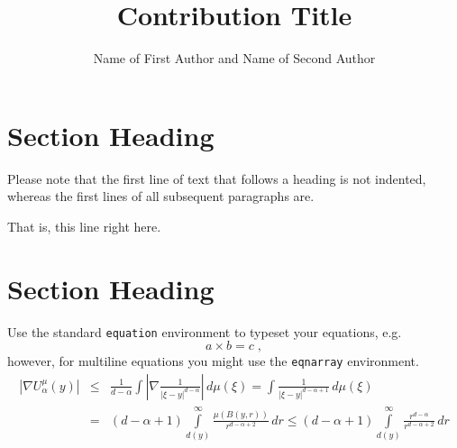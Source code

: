 %
%

%
%
%
%
%

\begin{bibunit}

\title*{Contribution Title}
\author{Name of First Author and Name of Second Author}
\maketitle


\section{Section Heading}\label{01:section:1}

Please note that the first line of text that follows a heading is not indented, whereas the first lines of all subsequent paragraphs are.

That is, this line right here.

\section{Section Heading}\label{01:section:2}

Use the standard \verb|equation| environment to typeset your equations, e.g.
%
\begin{equation}
a \times b = c\;,
\end{equation}
%
however, for multiline equations you might use the \verb|eqnarray| environment.
\begin{eqnarray}
\left|\nabla U_{\alpha}^{\mu}(y)\right| &\le&\frac1{d-\alpha}\int
\left|\nabla\frac1{|\xi-y|^{d-\alpha}}\right|\,d\mu(\xi) =
\int \frac1{|\xi-y|^{d-\alpha+1}} \,d\mu(\xi)  \\
&=&(d-\alpha+1) \int\limits_{d(y)}^\infty
\frac{\mu(B(y,r))}{r^{d-\alpha+2}}\,dr \le (d-\alpha+1)
\int\limits_{d(y)}^\infty \frac{r^{d-\alpha}}{r^{d-\alpha+2}}\,dr
\label{eq:01}
\end{eqnarray}


\end{bibunit}

